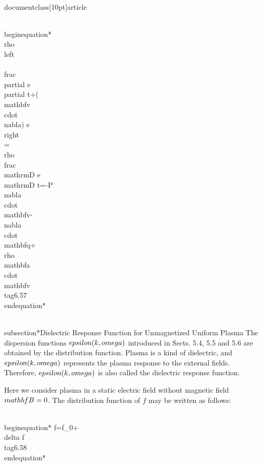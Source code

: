 \\documentclass[10pt]{article}
\begin{document}
{{{{\\begin{equation*}
\\rho\\left\\{\\frac{\\partial e}{\\partial t}+(\\mathbf{v} \\cdot \\nabla) e\\right\\}=\\rho \\frac{\\mathrm{D} e}{\\mathrm{D} t}=-P \\nabla \\cdot \\mathbf{v}-\\nabla \\cdot \\mathbf{q}+\\rho \\mathbf{a} \\cdot \\mathbf{v} \\tag{6.57}
\\end{equation*}


\\subsection*{Dielectric Response Function for Unmagnetized Uniform Plasma}
The dispersion functions $\\epsilon(k, \\omega)$ introduced in Sects. 5.4, 5.5 and 5.6 are obtained by the distribution function. Plasma is a kind of dielectric, and $\\epsilon(k, \\omega)$ represents the plasma response to the external fields. Therefore, $\\epsilon(k, \\omega)$ is also called the dielectric response function.

Here we consider plasma in a static electric field without magnetic field $\\mathbf{B}=0$. The distribution function of $f$ may be written as follows:


\\begin{equation*}
f=f_{0}+\\delta f \\tag{6.58}
\\end{equation*}


}}}}
\end{document}
